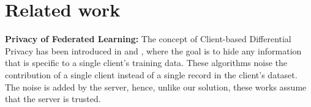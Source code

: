 \documentclass[accepted]{uai2021} %
\begin{document}



\section{Related work}
\label{sec:related_work}





\noindent \textbf{Privacy of Federated Learning:}
The concept of Client-based Differential Privacy has been introduced in \cite{Client-DP-McMahan} and \cite{Client-DP-ETH-Zurich}, where the goal is to hide any information that is specific to a single client's training data. These algorithms noise the contribution of a single client instead of a single record in the client's dataset. The noise is added by the server, hence, unlike our solution, these works assume that the server is trusted. 
\end{document}
